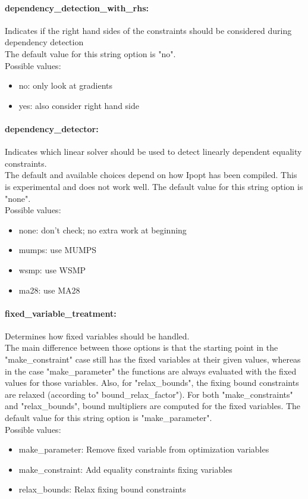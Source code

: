 \paragraph{dependency\_detection\_with\_rhs:}\label{sec:dependency_detection_with_rhs} Indicates if the right hand sides of the constraints should be considered during dependency detection $\;$ \\

The default value for this string option is "no".
\\ 
Possible values:
\begin{itemize}
   \item no: only look at gradients
   \item yes: also consider right hand side
\end{itemize}

\paragraph{dependency\_detector:}\label{sec:dependency_detector} Indicates which linear solver should be used to detect linearly dependent equality constraints. $\;$ \\
 The default and available choices depend on how
Ipopt has been compiled.  This is experimental
and does not work well.
The default value for this string option is "none".
\\ 
Possible values:
\begin{itemize}
   \item none: don't check; no extra work at beginning
   \item mumps: use MUMPS
   \item wsmp: use WSMP
   \item ma28: use MA28
\end{itemize}

\paragraph{fixed\_variable\_treatment:}\label{sec:fixed_variable_treatment} Determines how fixed variables should be handled. $\;$ \\
 The main difference between those options is that
the starting point in the "make\_constraint" case
still has the fixed variables at their given
values, whereas in the case "make\_parameter" the
functions are always evaluated with the fixed
values for those variables.  Also, for
"relax\_bounds", the fixing bound constraints are
relaxed (according to" bound\_relax\_factor").
For both "make\_constraints" and "relax\_bounds",
bound multipliers are computed for the fixed
variables.
The default value for this string option is "make\_parameter".
\\ 
Possible values:
\begin{itemize}
   \item make\_parameter: Remove fixed variable from optimization
variables
   \item make\_constraint: Add equality constraints fixing variables
   \item relax\_bounds: Relax fixing bound constraints
\end{itemize}


